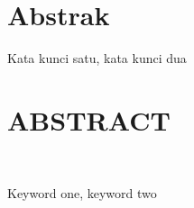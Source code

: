 %
%
%

\chapter*{Abstrak}

\vspace*{0.2cm}


\noindent {}

\lipsum[8-10]

\vspace*{0.2cm}

\noindent {} Kata kunci satu, kata kunci dua \\

\newpage

%
%
%

\chapter*{ABSTRACT}

\vspace*{0.2cm}



\noindent {}

\lipsum[66-68] \\

\vspace*{0.2cm}

\noindent {} Keyword one, keyword two \\

\newpage
